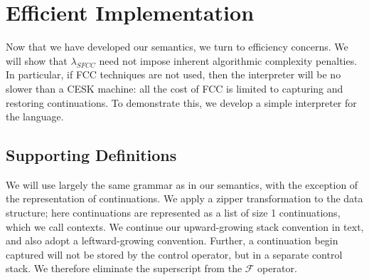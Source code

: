 \documentclass[11pt]{article}
\newcommand{\maybePage}{\newpage}
\newcommand\F{\mathcal{F}}
\begin{document}




%

\maybePage
\section{Efficient Implementation}
\label{sec:efficientImpl}

Now that we have developed our semantics, we turn to efficiency concerns.
We will show that $\lambda_{SFCC}$ need not impose inherent algorithmic complexity penalties.
In particular, if FCC techniques are not used, then the interpreter will be no slower than a CESK machine: all the cost of FCC is limited to capturing and restoring continuations.
To demonstrate this, we develop a simple interpreter for the language.

\maybePage
\subsection{Supporting Definitions}

We will use largely the same grammar as in our semantics, with the exception of the representation of continuations.
We apply a zipper transformation to the data structure; here continuations are represented as a list of size 1 continuations, which we call contexts.
We continue our upward-growing stack convention in text, and also adopt a leftward-growing convention.
Further, a continuation begin captured will not be stored by the control operator, but in a separate control stack.
We therefore eliminate the superscript from the $\F$ operator.
\end{document}
